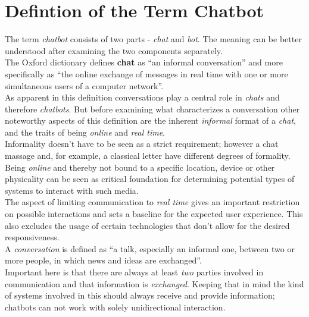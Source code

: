 \section{Defintion of the Term Chatbot}


The term \emph{chatbot} consists of two parts - \emph{chat} and \emph{bot}. The meaning can be better understood after examining the two components separately.
\\

The Oxford dictionary defines \textbf{chat} as ``an informal conversation'' and more specifically as ``the online exchange of messages in real time with one or more simultaneous users of a computer network''\cite{oxfordchat}.
\\
As apparent in this definition conversations play a central role in \emph{chats} and therefore \emph{chatbots}. But before examining what characterizes a conversation other noteworthy aspects of this definition are the inherent \emph{informal} format of a \emph{chat}, and the traits of being \emph{online} and \emph{real time}.
\\
Informality doesn't have to be seen as a strict requirement; however a chat massage and, for example, a classical letter have different degrees of formality.
\\
Being \emph{online} and thereby not bound to a specific location, device or other physicality can be seen as critical foundation for determining potential types of systems to interact with such media.
\\
The aspect of limiting communication to \emph{real time} gives an important restriction on possible interactions and sets a baseline for the expected user experience. This also excludes the usage of certain technologies that don't allow for the desired responsiveness.
\\
A \emph{conversation} is defined as ``a talk, especially an informal one, between two or more people, in which news and ideas are exchanged''\cite{oxfordconversation}.
\\
Important here is that there are always at least \emph{two} parties involved in communication and that information is \emph{exchanged}. Keeping that in mind the kind of systems involved in this should always receive and provide information; chatbots can not work with solely unidirectional interaction.
\\

